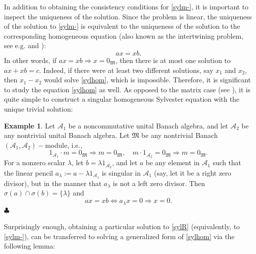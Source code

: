 \documentclass{article}
\theoremstyle{definition}
\newtheorem{example}{Example}[section]
\def\A{{\mathcal{A}}}
\def\M{\mathfrak{M}}
\begin{document}
In addition to obtaining the consistency conditions for \eqref{sylm-}, it is important to inspect the uniqueness of the solution. Since the problem is linear, the uniqueness of the solution to \eqref{sylm-} is equivalent to the uniqueness of the solution to the corresponding homogeneous equation (also known as the intertwining problem, see e.g. \cite{JB} and \cite{HM}):
\begin{equation}
\label{sylhom} ax=xb.
\end{equation} 
In other words, if $ax=xb\Rightarrow x=0_\M$, then there is at most one solution to $ax+xb=c$. Indeed, if there were at least two different solutions, say $x_1$ and $x_2$, then $x_1-x_2$ would solve \eqref{sylhom}, which is impossible. Therefore, it is significant to study the equation \eqref{sylhom} as well. As opposed to the matrix case (see \cite{MD}), it is quite simple to construct a singular homogeneous Sylvester equation with the unique trivial solution:

\begin{example} Let $\A_1$ be a noncommutative unital Banach algebra, and let $\A_2$ be any nontrivial unital Banach algebra. Let $\M$ be any nontrivial Banach $(\A_1,\A_2)-$module, i.e., 
$$1_{\A_1}\cdot m=0_\M\Rightarrow m=0_\M,\quad m\cdot 1_{\A_2}=0_\M\Rightarrow m=0_\M.$$ 
For a nonzero scalar $\lambda$, let $b=\lambda 1_{\A_2}$, and let $a$ be any element in $\A_1$ such that the linear pencil $a_\lambda:=a-\lambda1_{\A_1}$ is singular in $\A_1$ (say, let it be a right zero divisor), but in the manner that $a_\lambda$ is not a left zero divisor. Then $\sigma(a)\cap\sigma(b)=\{\lambda\}$ and
$$ax=xb\Leftrightarrow a_\lambda x=0\Rightarrow x=0.$$
\hfill$\clubsuit$
\end{example}
Surprisingly enough, obtaining a particular solution to \eqref{sylR} (equivalently, to \eqref{sylm-}), can be transferred to solving a generalized form of \eqref{sylhom} via the following lemma: 
\end{document}
